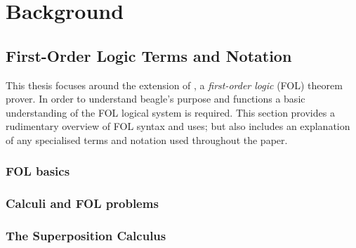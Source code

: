 
\chapter{Background}
\label{cha:background}

\section{First-Order Logic Terms and Notation}
\label{sec:senfol}

This thesis focuses around the extension of \beagle, a \emph{first-order logic} (FOL) theorem prover.
In order to understand beagle's purpose and functions a basic understanding of the FOL logical system
is required. This section provides a rudimentary overview of FOL syntax and uses;
but also includes an explanation of any specialised terms and notation used throughout the paper.

\subsection{FOL basics}

\subsection{Calculi and FOL problems}

\subsection{The Superposition Calculus}


